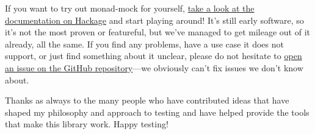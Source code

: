 If you want to try out monad-mock for yourself,
\href{https://hackage.haskell.org/package/monad-mock}{take a look at the
documentation on Hackage} and start playing around! It's still early
software, so it's not the most proven or featureful, but we've managed
to get mileage out of it already, all the same. If you find any
problems, have a use case it does not support, or just find something
about it unclear, please do not hesitate to
\href{https://github.com/cjdev/monad-mock}{open an issue on the GitHub
repository}---we obviously can't fix issues we don't know about.

Thanks as always to the many people who have contributed ideas that have
shaped my philosophy and approach to testing and have helped provide the
tools that make this library work. Happy testing!
